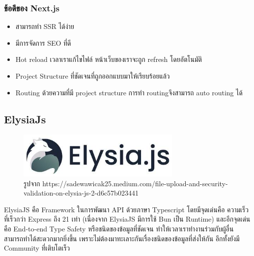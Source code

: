 \subsubsection{ข้อดีของ Next.js}
\begin{itemize}
  \item สามารถทำ SSR ได้ง่าย
  \item มีการจัดการ SEO ที่ดี
  \item Hot reload เวลาเราแก้ไขไฟล์ หน้าเว็บของเราจะถูก refresh โดยอัตโนมัติ 
  \item Project Structure ที่ชัดเจนที่ถูกออกแบบมาให้เรียบร้อยแล้ว
  \item Routing ด้วยความที่มี project structure การทำ routingจึงสามารถ auto routing ได้
\end{itemize}


\subsection{ElysiaJs}
\begin{figure}[H] %
    \centering
    \includegraphics[width=80mm, keepaspectratio ]{pictures/elysia.jpg}
    \caption[Elysia]{รูปจาก https://sadewawicak25.medium.com/file-upload-and-security-validation-on-elysia-js-2-d6c57b023441}
    \label{fig:elysia}
\end{figure}
\hspace{1.27cm}ElysiaJS\cite{ElysiaJs} คือ Framework ในการพัฒนา API ด้วยภาษา Typescript โดยมีจุดเด่นคือ ความเร็วที่เร็วกว่า Express ถึง 21 เท่า (เนื่องจาก ElysiaJS มีการใช้ Bun เป็น Runtime) และอีกจุดเด่นคือ End-to-end Type Safety หรือชนิดของข้อมูลที่ชัดเจน ทำให้เวลาเราทำงานร่วมกับผู้อื่นสามารถทำได้สะดวกมากยิ่งขึ้น เพราะไม่ต้องมาทะเลาะกันเรื่องชนิดของข้อมูลที่ส่งให้กัน อีกทั้งยังมี Community ที่เติบโตเร็ว



